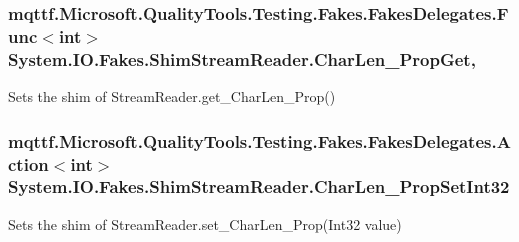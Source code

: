 \hypertarget{class_system_1_1_i_o_1_1_fakes_1_1_shim_stream_reader_a7da961135df9dff6861e956c139fd21b}{
\subsubsection[{Char\-Len\-\_\-\-Prop\-Get}]{\setlength{\rightskip}{0pt plus 5cm}mqttf.\-Microsoft.\-Quality\-Tools.\-Testing.\-Fakes.\-Fakes\-Delegates.\-Func$<$int$>$ System.\-I\-O.\-Fakes.\-Shim\-Stream\-Reader.\-Char\-Len\-\_\-\-Prop\-Get\hspace{0.3cm}{\ttfamily [get]}, {\ttfamily [set]}}}\label{class_system_1_1_i_o_1_1_fakes_1_1_shim_stream_reader_a7da961135df9dff6861e956c139fd21b}


Sets the shim of Stream\-Reader.\-get\-\_\-\-Char\-Len\-\_\-\-Prop()

\hypertarget{class_system_1_1_i_o_1_1_fakes_1_1_shim_stream_reader_a668b8fcf5ef14a74f1ab7c6ca3b3aceb}{
\subsubsection[{Char\-Len\-\_\-\-Prop\-Set\-Int32}]{\setlength{\rightskip}{0pt plus 5cm}mqttf.\-Microsoft.\-Quality\-Tools.\-Testing.\-Fakes.\-Fakes\-Delegates.\-Action$<$int$>$ System.\-I\-O.\-Fakes.\-Shim\-Stream\-Reader.\-Char\-Len\-\_\-\-Prop\-Set\-Int32\hspace{0.3cm}{\ttfamily [set]}}}\label{class_system_1_1_i_o_1_1_fakes_1_1_shim_stream_reader_a668b8fcf5ef14a74f1ab7c6ca3b3aceb}


Sets the shim of Stream\-Reader.\-set\-\_\-\-Char\-Len\-\_\-\-Prop(\-Int32 value)

